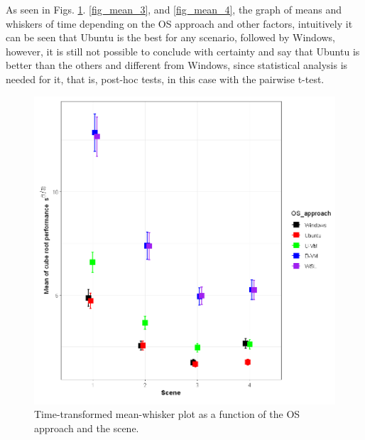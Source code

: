 \documentclass[conference]{IEEEtran}
\begin{document}
As seen in Figs. \ref{fig_mean_2}. \ref{fig_mean_3}, and \ref{fig_mean_4}, the graph of means and whiskers of time depending on the OS approach and other factors, intuitively it can be seen that Ubuntu is the best for any scenario, followed by Windows, however, it is still not possible to conclude with certainty and say that Ubuntu is better than the others and different from Windows, since statistical analysis is needed for it, that is, post-hoc tests, in this case with the pairwise t-test.

\begin{figure}[tb]
    \centering
    \includegraphics[scale=0.5]{figures/mean2.PNG}
    \caption{Time-transformed mean-whisker plot as a function of the OS approach and the scene.}
    \label{fig_mean_2}
\end{figure}
\end{document}
